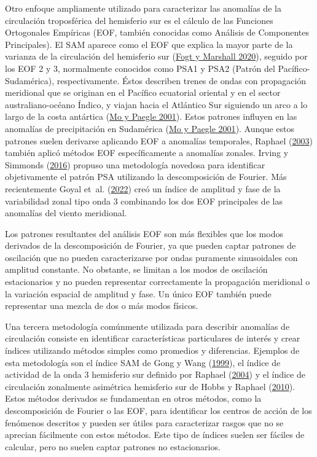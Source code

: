 \documentclass[12pt,oneside,a4paper]{reedthesis}
\begin{document}
Otro enfoque ampliamente utilizado para caracterizar las anomalías de la circulación troposférica del hemisferio sur es el cálculo de las Funciones Ortogonales Empíricas (EOF, también conocidas como Análisis de Componentes Principales).
El SAM aparece como el EOF que explica la mayor parte de la varianza de la circulación del hemisferio sur (\protect\hyperlink{ref-fogt2020}{Fogt y Marshall 2020}), seguido por los EOF 2 y 3, normalmente conocidos como PSA1 y PSA2 (Patrón del Pacífico-Sudamérica), respectivamente.
Éstos describen trenes de ondas con propagación meridional que se originan en el Pacífico ecuatorial oriental y en el sector australiano-océano Índico, y viajan hacia el Atlántico Sur siguiendo un arco a lo largo de la costa antártica (\protect\hyperlink{ref-mo2001}{Mo y Paegle 2001}).
Estos patrones influyen en las anomalías de precipitación en Sudamérica (\protect\hyperlink{ref-mo2001}{Mo y Paegle 2001}).
Aunque estos patrones suelen derivarse aplicando EOF a anomalías temporales, Raphael (\protect\hyperlink{ref-raphael2003}{2003}) también aplicó métodos EOF específicamente a anomalías zonales.
Irving y Simmonds (\protect\hyperlink{ref-irving2016}{2016}) propuso una metodología novedosa para identificar objetivamente el patrón PSA utilizando la descomposición de Fourier.
Más recientemente Goyal et~al. (\protect\hyperlink{ref-goyal2022}{2022}) creó un índice de amplitud y fase de la variabilidad zonal tipo onda 3 combinando los dos EOF principales de las anomalías del viento meridional.

Los patrones resultantes del análisis EOF son más flexibles que los modos derivados de la descomposición de Fourier, ya que pueden captar patrones de oscilación que no pueden caracterizarse por ondas puramente sinusoidales con amplitud constante.
No obstante, se limitan a los modos de oscilación estacionarios y no pueden representar correctamente la propagación meridional o la variación espacial de amplitud y fase.
Un único EOF también puede representar una mezcla de dos o más modos físicos.

Una tercera metodología comúnmente utilizada para describir anomalías de circulación consiste en identificar características particulares de interés y crear índices utilizando métodos simples como promedios y diferencias.
Ejemplos de esta metodología son el índice SAM de Gong y Wang (\protect\hyperlink{ref-gong1999}{1999}), el índice de actividad de la onda 3 hemisferio sur definido por Raphael (\protect\hyperlink{ref-raphael2004}{2004}) y el índice de circulación zonalmente asimétrica hemisferio sur de Hobbs y Raphael (\protect\hyperlink{ref-hobbs2010}{2010}).
Estos métodos derivados se fundamentan en otros métodos, como la descomposición de Fourier o las EOF, para identificar los centros de acción de los fenómenos descritos y pueden ser útiles para caracterizar rasgos que no se aprecian fácilmente con estos métodos.
Este tipo de índices suelen ser fáciles de calcular, pero no suelen captar patrones no estacionarios.
\end{document}
